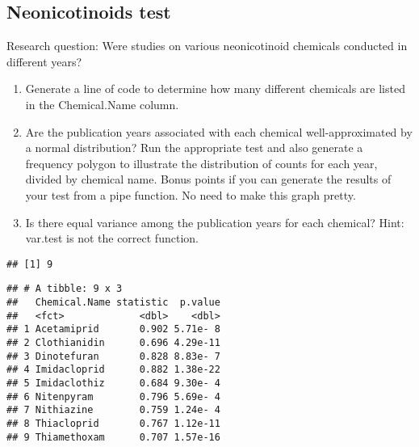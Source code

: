 \documentclass[]{article}
\newenvironment{Shaded}{\begin{snugshade}}{\end{snugshade}}
\newcommand{\KeywordTok}[1]{\textcolor[rgb]{0.13,0.29,0.53}{\textbf{#1}}}
\newcommand{\DataTypeTok}[1]{\textcolor[rgb]{0.13,0.29,0.53}{#1}}
\newcommand{\CommentTok}[1]{\textcolor[rgb]{0.56,0.35,0.01}{\textit{#1}}}
\newcommand{\OperatorTok}[1]{\textcolor[rgb]{0.81,0.36,0.00}{\textbf{#1}}}
\newcommand{\NormalTok}[1]{#1}
\begin{document}
\subsection{Neonicotinoids test}\label{neonicotinoids-test}

Research question: Were studies on various neonicotinoid chemicals
conducted in different years?

\begin{enumerate}
\def\labelenumi{\arabic{enumi}.}
\setcounter{enumi}{2}
\item
  Generate a line of code to determine how many different chemicals are
  listed in the Chemical.Name column.
\item
  Are the publication years associated with each chemical
  well-approximated by a normal distribution? Run the appropriate test
  and also generate a frequency polygon to illustrate the distribution
  of counts for each year, divided by chemical name. Bonus points if you
  can generate the results of your test from a pipe function. No need to
  make this graph pretty.
\item
  Is there equal variance among the publication years for each chemical?
  Hint: var.test is not the correct function.
\end{enumerate}

\begin{Shaded}
\end{Shaded}

\begin{verbatim}
## [1] 9
\end{verbatim}

\begin{Shaded}
\end{Shaded}

\begin{verbatim}
## # A tibble: 9 x 3
##   Chemical.Name statistic  p.value
##   <fct>             <dbl>    <dbl>
## 1 Acetamiprid       0.902 5.71e- 8
## 2 Clothianidin      0.696 4.29e-11
## 3 Dinotefuran       0.828 8.83e- 7
## 4 Imidacloprid      0.882 1.38e-22
## 5 Imidaclothiz      0.684 9.30e- 4
## 6 Nitenpyram        0.796 5.69e- 4
## 7 Nithiazine        0.759 1.24e- 4
## 8 Thiacloprid       0.767 1.12e-11
## 9 Thiamethoxam      0.707 1.57e-16
\end{verbatim}
\end{document}
